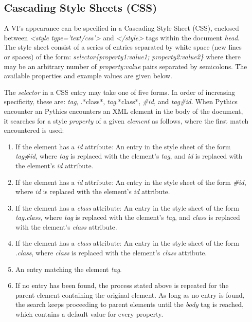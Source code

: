 \documentclass[letterpaper,10pt,english]{sphinxmanual}
\begin{document}
\subsection{Cascading Style Sheets (CSS)}
\label{programming:cascading-style-sheets-css}
A VI's appearance can be specified in a Cascading Style Sheet (CSS), enclosed
between \emph{\textless{}style type='text/css'\textgreater{}} and  \emph{\textless{}/style\textgreater{}} tags within the document
\emph{head}. The style sheet consist of a series of entries separated by white space
(new lines or spaces) of the form:
\emph{selector\{property1:value1; property2:value2\}}
where there may be an arbitrary number of \emph{property:value} pairs separated
by semicolons. The available properties and example values are given below.

The \emph{selector} in a CSS entry may take one of five forms. In order of increasing
specificity, these are:  \emph{tag}, .*class*, \emph{tag}.*class*, \emph{\#id}, and
\emph{tag\#id}. When Pythics encounter an Pythics encounters an XML element in the
body of the document, it searches for a style \emph{property} of a given \emph{element}
as follows, where the first match encountered is used:
\begin{enumerate}
\item {} 
If the element has a \emph{id} attribute: An entry in the style sheet of the form
\emph{tag\#id}, where \emph{tag} is replaced with the element's \emph{tag}, and \emph{id} is
replaced with the element's \emph{id} attribute.

\item {} 
If the element has a \emph{id} attribute: An entry in the style sheet of the form
\emph{\#id}, where \emph{id} is replaced with the element's \emph{id} attribute.

\item {} 
If the element has a \emph{class} attribute: An entry in the style sheet of the
form \emph{tag.class}, where \emph{tag} is replaced with the element's \emph{tag}, and
\emph{class} is replaced with the element's \emph{class} attribute.

\item {} 
If the element has a \emph{class} attribute: An entry in the style sheet of the
form \emph{.class}, where \emph{class} is replaced with the element's \emph{class}
attribute.

\item {} 
An entry matching the element \emph{tag}.

\item {} 
If no entry has been found, the process stated above is repeated for the
parent element containing the original element. As long as no entry is found,
the search keeps proceeding to parent elements until the \emph{body} tag is
reached, which contains a default value for every property.

\end{enumerate}
\end{document}
